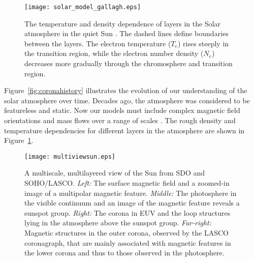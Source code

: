 \begin{figure}[!t]
\centerline{\texttt{[image: solar\_model\_gallagh.eps]}}
\caption[The temperature and density dependence of the Solar atmosphere.]{The temperature and density dependence of layers in the Solar atmosphere in the quiet Sun \citep[from][]{Gallagher:2000}. The dashed lines define boundaries between the layers. The electron temperature ($T_e$) rises steeply in the transition region, while the electron number density ($N_e$) decreases more gradually through the chromosphere and transition region.}
\label{fig:atmostdens}
\end{figure}


Figure~\ref{fig:coronahistory} illustrates the evolution of our understanding of the solar atmosphere over time. Decades ago, the atmosphere was considered to be featureless and static. Now our models must include complex magnetic field orientations and mass flows over a range of scales \citep{Schrijver:2001b}. The rough density and temperature dependencies for different layers in the atmosphere are shown in Figure~\ref{fig:atmostdens}.

\begin{landscape}
\begin{figure}%
\centerline{\texttt{[image: multiviewsun.eps]}}
\caption[A view of the Sun from SDO and SOHO/LASCO.]{A multiscale, multilayered view of the Sun from SDO and SOHO/LASCO. \emph{Left:} The surface magnetic field and a zoomed-in image of a multipolar magnetic feature. \emph{Middle:} The photosphere in the visible continuum and an image of the magnetic feature reveals a sunspot group. \emph{Right:} The corona in EUV and the loop structures lying in the atmosphere above the sunspot group. \emph{Far-right:} Magnetic structures in the outer corona, observed by the LASCO coronagraph, that are mainly associated with magnetic features in the lower corona and thus to those observed in the photosphere.}
\label{fig:multiviewsun}
\end{figure}
\end{landscape}


